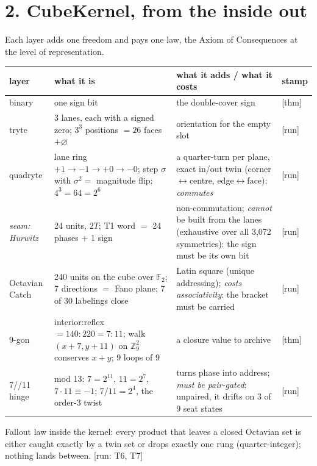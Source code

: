 \documentclass[11pt,a4paper]{article}
\newcommand{\stamp}[1]{\textsf{\small[#1]}}
\newcommand{\E}{\varnothing}
\begin{document}
\section*{2. CubeKernel, from the inside out}
Each layer adds one freedom and pays one law, the Axiom of Consequences at the level of representation.
\begin{center}\small
\begin{tabular}{@{}p{2.3cm}p{5.3cm}p{4.1cm}p{1.6cm}@{}}\toprule
layer & what it is & what it adds / what it costs & stamp\\\midrule
binary & one sign bit & the double-cover sign & \stamp{thm}\\
tryte & 3 lanes, each with a signed zero; $3^3$ positions $=26$ faces$+\E$ & orientation for the empty slot & \stamp{run}\\
quadryte & lane ring $+1\to-1\to+0\to-0$; step $\sigma$ with $\sigma^2=$ magnitude flip; $4^3=64=2^6$ & a quarter-turn per plane, exact in/out twin (corner$\leftrightarrow$centre, edge$\leftrightarrow$face); \emph{commutes} & \stamp{run}\\
\emph{seam: Hurwitz} & 24 units, $2T$; T1 word $=$ 24 phases $+$ 1 sign & non-commutation; \emph{cannot} be built from the lanes (exhaustive over all 3,072 symmetries): the sign must be its own bit & \stamp{run}\\
Octavian Catch & 240 units on the cube over $\mathbb F_2$; 7 directions $=$ Fano plane; 7 of 30 labelings close & Latin square (unique addressing); \emph{costs associativity}: the bracket must be carried & \stamp{run}\\
9-gon & interior:reflex $=140:220=7:11$; walk $(x{+}7,y{+}11)$ on $\mathbb Z_9^2$ conserves $x+y$; 9 loops of 9 & a closure value to archive & \stamp{thm}\\
7//11 hinge & mod 13: $7=2^{11}$, $11=2^7$, $7\cdot11\equiv-1$; $7/11=2^4$, the order-3 twist & turns phase into address; \emph{must be pair-gated}: unpaired, it drifts on 3 of 9 seat states & \stamp{run}\\\bottomrule
\end{tabular}
\end{center}
Fallout law inside the kernel: every product that leaves a closed Octavian set is either caught exactly by a twin set or drops exactly one rung (quarter-integer); nothing lands between. \stamp{run: T6, T7}
\end{document}
